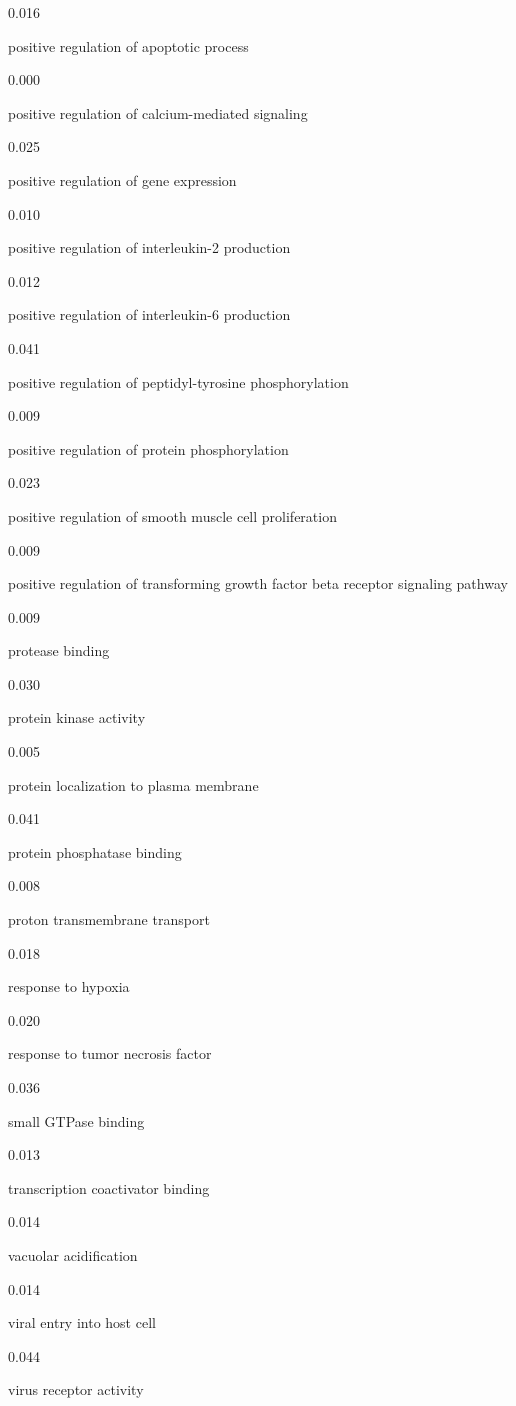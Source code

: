 \documentclass[
  letterpaper,
  DIV=11,
  numbers=noendperiod,
  openany,
  oneside]{scrreprt}
\begin{document}
0.016

positive regulation of apoptotic process

0.000

positive regulation of calcium-mediated signaling

0.025

positive regulation of gene expression

0.010

positive regulation of interleukin-2 production

0.012

positive regulation of interleukin-6 production

0.041

positive regulation of peptidyl-tyrosine phosphorylation

0.009

positive regulation of protein phosphorylation

0.023

positive regulation of smooth muscle cell proliferation

0.009

positive regulation of transforming growth factor beta receptor
signaling pathway

0.009

protease binding

0.030

protein kinase activity

0.005

protein localization to plasma membrane

0.041

protein phosphatase binding

0.008

proton transmembrane transport

0.018

response to hypoxia

0.020

response to tumor necrosis factor

0.036

small GTPase binding

0.013

transcription coactivator binding

0.014

vacuolar acidification

0.014

viral entry into host cell

0.044

virus receptor activity
\end{document}
